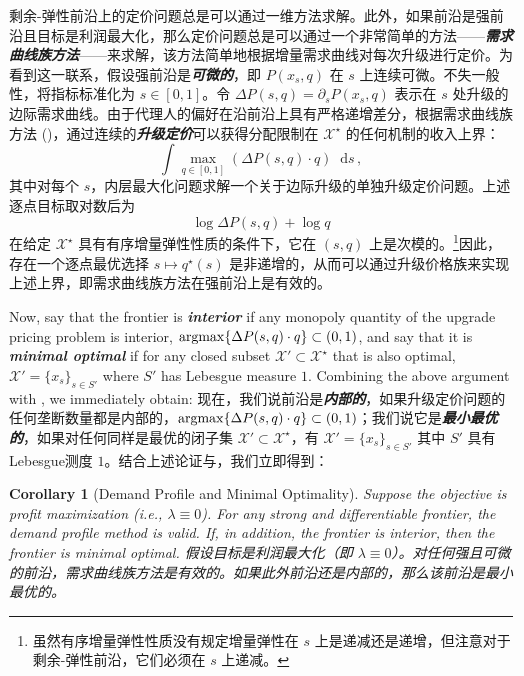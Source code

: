 \documentclass[12pt,letterpaper]{article}
\newenvironment{original}{\color{black}\noindent}{}
\newenvironment{translation}{\color{blue}\noindent}{}
\theoremstyle{plain}
\newtheorem{cor}{Corollary}
\theoremstyle{definition}
\theoremstyle{remark}
\renewcommand{\1}{\mathds{1}}
\renewcommand*\d{\mathop{}\!\mathrm{d}}
\newcommand{\argmax}{\operatornamewithlimits{argmax}}
\newcommand{\X}{\mathcal{X}}
\theoremstyle{definition}
\begin{document}
\begin{translation}
剩余-弹性前沿上的定价问题总是可以通过一维方法求解。此外，如果前沿是强前沿且目标是利润最大化，那么定价问题总是可以通过一个非常简单的方法——\textit{\textbf{需求曲线族方法}}——来求解，该方法简单地根据增量需求曲线对每次升级进行定价。为看到这一联系，假设强前沿是\textit{\textbf{可微的}}，即 $P(x_s, q)$ 在 $s$ 上连续可微。不失一般性，将指标标准化为 $s \in [0, 1]$。令 $\Delta P(s, q) = \partial_s P(x_s, q)$ 表示在 $s$ 处升级的边际需求曲线。由于代理人的偏好在沿前沿上具有严格递增差分，根据需求曲线族方法 (\citealt{wilson1993nonlinear})，通过连续的\textit{\textbf{升级定价}}可以获得分配限制在 $\X^\star$ 的任何机制的收入上界：
\[\int \max_{q \in [0, 1]}(\Delta P(s, q) \cdot q) \d s\,,\]
其中对每个 $s$，内层最大化问题求解一个关于边际升级的单独升级定价问题。上述逐点目标取对数后为
\[\log \Delta P(s, q) + \log q\]
在给定 $\X^\star$ 具有有序增量弹性性质的条件下，它在 $(s, q)$ 上是次模的。\footnote{虽然有序增量弹性性质没有规定增量弹性在 $s$ 上是递减还是递增，但注意对于剩余-弹性前沿，它们必须在 $s$ 上递减。}因此，存在一个逐点最优选择 $s \mapsto q^\star(s)$ 是非递增的，从而可以通过升级价格族来实现上述上界，即需求曲线族方法在强前沿上是有效的。
\end{translation}

\begin{original}
Now, say that the frontier is \textit{\textbf{interior}} if any monopoly quantity of the upgrade pricing problem is interior, $\argmax \{\Delta P(s, q) \cdot q\} \subset (0, 1)$, and say that it is \textit{\textbf{minimal optimal}} if for any closed subset $\X' \subset \X^\star$ that is also optimal, $\X' = \{x_{s}\}_{s \in S'}$ where $S'$ has Lebesgue measure $1$. Combining the above argument with , we immediately obtain:
\end{original}
\begin{translation}
现在，我们说前沿是\textit{\textbf{内部的}}，如果升级定价问题的任何垄断数量都是内部的，$\argmax \{\Delta P(s, q) \cdot q\} \subset (0, 1)$；我们说它是\textit{\textbf{最小最优的}}，如果对任何同样是最优的闭子集 $\X' \subset \X^\star$，有 $\X' = \{x_{s}\}_{s \in S'}$ 其中 $S'$ 具有Lebesgue测度 $1$。结合上述论证与，我们立即得到：
\end{translation}

\begin{cor}[Demand Profile and Minimal Optimality]\label{cor:profile}
\begin{original}
Suppose the objective is profit maximization (i.e., $\lambda \equiv 0$). For any strong and differentiable frontier, the demand profile method is valid. If, in addition, the frontier is interior, then the frontier is minimal optimal.
\end{original}
\begin{translation}
假设目标是利润最大化（即 $\lambda \equiv 0$）。对任何强且可微的前沿，需求曲线族方法是有效的。如果此外前沿还是内部的，那么该前沿是最小最优的。
\end{translation}
\end{cor}
\end{document}
